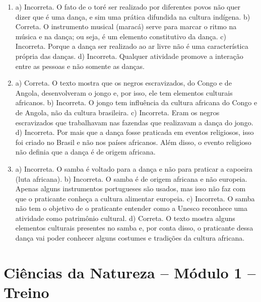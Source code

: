 \begin{enumerate}
\item
a) Incorreta. O fato de o toré ser realizado por diferentes povos não quer
dizer que é uma dança, e sim uma prática difundida na cultura indígena.
b) Correta. O instrumento musical (maracá) serve para marcar o ritmo na música e na dança; ou seja, é um elemento constitutivo da dança.
c) Incorreta. Porque a dança ser realizado ao ar livre não é uma
característica própria das danças.
d) Incorreta. Qualquer atividade promove a interação entre as
pessoas e não somente as danças.

\item
a) Correta. O texto mostra que os negros escravizados, do Congo e
de Angola, desenvolveram o jongo e, por isso, ele tem elementos
culturais africanos.
b) Incorreta. O jongo tem influência da cultura africana do Congo
e de Angola, não da cultura brasileira.
c) Incorreta. Eram os negros escravizados que trabalhavam nas
fazendas que realizavam a dança do jongo.
d) Incorreta. Por mais que a dança fosse praticada em eventos religiosos,
isso foi criado no Brasil e não nos países africanos. Além disso, o
evento religioso não definia que a dança é de origem africana.

\item
a) Incorreta. O samba é voltado para a dança e não para praticar a capoeira (luta africana).
b) Incorreta. O samba é de origem africana e não europeia. Apenas
alguns instrumentos portugueses são usados, mas isso não faz com que o
praticante conheça a cultura alimentar europeia.
c) Incorreta. O samba não tem o objetivo de o praticante entender
como a Unesco reconhece uma atividade como patrimônio cultural.
d) Correta. O texto mostra alguns elementos culturais presentes
no samba e, por conta disso, o praticante dessa dança vai poder conhecer
alguns costumes e tradições da cultura africana.
\end{enumerate}

\section*{Ciências da Natureza -- Módulo 1 -- Treino}

